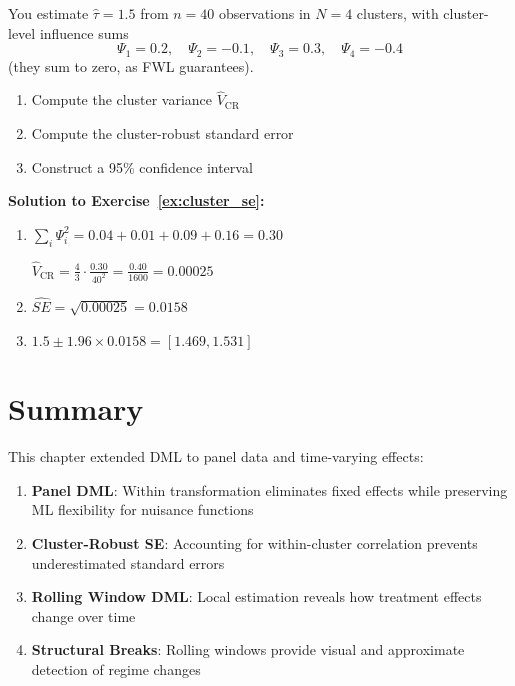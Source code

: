 \begin{exercise}
\label{ex:cluster_se}
You estimate $\hat{\tau} = 1.5$ from $n = 40$ observations in $N=4$
clusters, with cluster-level influence sums
\[
\Psi_1 = 0.2, \quad \Psi_2 = -0.1, \quad \Psi_3 = 0.3, \quad \Psi_4 = -0.4
\]
(they sum to zero, as FWL guarantees).

\begin{enumerate}
    \item[(a)] Compute the cluster variance $\hat{V}_{\text{CR}}$
    \item[(b)] Compute the cluster-robust standard error
    \item[(c)] Construct a 95\% confidence interval
\end{enumerate}
\end{exercise}

\textbf{Solution to Exercise~\ref{ex:cluster_se}:}

\begin{enumerate}
    \item[(a)] $\sum_i \Psi_i^2 = 0.04 + 0.01 + 0.09 + 0.16 = 0.30$

    $\hat{V}_{\text{CR}} = \frac{4}{3} \cdot \frac{0.30}{40^2} = \frac{0.40}{1600} = 0.00025$

    \item[(b)] $\widehat{SE} = \sqrt{0.00025} = 0.0158$

    \item[(c)] $1.5 \pm 1.96 \times 0.0158 = [1.469, 1.531]$
\end{enumerate}

\section{Summary}\label{sec:ch06_summary}

This chapter extended DML to panel data and time-varying effects:

\begin{enumerate}
    \item \textbf{Panel DML}: Within transformation eliminates fixed effects while preserving ML flexibility for nuisance functions

    \item \textbf{Cluster-Robust SE}: Accounting for within-cluster correlation prevents underestimated standard errors

    \item \textbf{Rolling Window DML}: Local estimation reveals how treatment effects change over time

    \item \textbf{Structural Breaks}: Rolling windows provide visual and approximate detection of regime changes
\end{enumerate}

